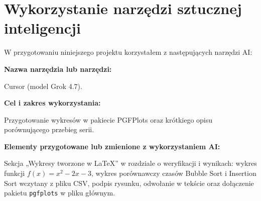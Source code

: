 %
%

\chapter{Wykorzystanie narzędzi sztucznej inteligencji}
\label{chap:wykorzystanie-ai}


W przygotowaniu niniejszego projektu korzystałem z następujących narzędzi AI:

\noindent\textbf{Nazwa narzędzia lub narzędzi:}\par
Cursor (model Grok 4.7).

\medskip
\noindent\textbf{Cel i zakres wykorzystania:}\par
Przygotowanie wykresów w pakiecie PGFPlots oraz krótkiego opisu
porównującego przebieg serii.

\medskip
\noindent\textbf{Elementy przygotowane lub zmienione z wykorzystaniem AI:}\par
Sekcja „Wykresy tworzone w LaTeX” w rozdziale o weryfikacji i wynikach:
wykres funkcji \(f(x) = x^{2} - 2x - 3\), wykres porównawczy czasów
Bubble Sort i Insertion Sort wczytany z pliku CSV, podpis rysunku,
odwołanie w tekście oraz dołączenie pakietu \texttt{pgfplots} w pliku
głównym.

